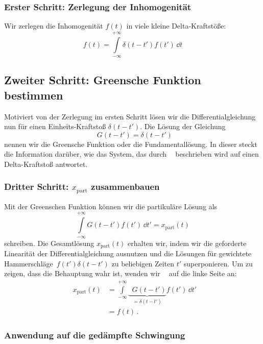 \documentclass[paper=a4, fontsize=11.0pt, abstractoff, DIV12]{scrartcl}
\newcommand{\xinhom}{\ensuremath{x_\mathrm{part}}}
\DeclareMathOperator{\Dt}{\mathcal{D}_t}
\begin{document}
\subsubsection{Erster Schritt: Zerlegung der Inhomogenität}

Wir zerlegen die Inhomogenität $f(t)$ in viele kleine Delta-Kraftstöße:
\begin{equation}
f(t) = \int\limits_{-\infty}^{+\infty}\delta(t-t')f(t')\,\dd t
\end{equation}

\subsection{Zweiter Schritt: Greensche Funktion bestimmen}

Motiviert von der Zerlegung im ersten Schritt lösen wir die
Differentialgleichung nun für einen Einheits-Kraftstoß $\delta(t-t')$. Die
Lösung der Gleichung
\begin{equation}
\Dt G(t-t') = \delta(t-t')
\end{equation}
nennen wir die Greensche Funktion oder die Fundamentallösung. In dieser
steckt die Information darüber, wie das System, das durch $\Dt$ beschrieben
wird auf einen Delta-Kraftstoß antwortet.

\subsubsection{Dritter Schritt: $\xinhom$ zusammenbauen}

Mit der Greenschen Funktion können wir die partikuläre Lösung als
\begin{equation}
\int\limits_{-\infty}^{+\infty} G(t-t') f(t') \,\dd t' = \xinhom(t)
\label{eq:InhomLsg}
\end{equation}
schreiben. Die Gesamtlösung $\xinhom(t)$ erhalten wir, indem wir die
geforderte Linearität der Differentialgleichung ausnutzen und die Lösungen
für gewichtete \glqq Hammerschläge\grqq~$f(t')\delta(t-t')$ zu beliebigen
Zeiten $t'$ superponieren. Um zu zeigen, dass die Behauptung wahr ist,
wenden wir $\Dt$ auf die linke Seite an:
\begin{align}
\Dt \xinhom(t) &= \int\limits_{-\infty}^{+\infty} \underbrace{\Dt G(t-t')}_{=\delta(t-t')} f(t') \,\dd t'\\
&=f(t)\,.
\end{align}

\subsubsection{Anwendung auf die gedämpfte Schwingung}
\end{document}
